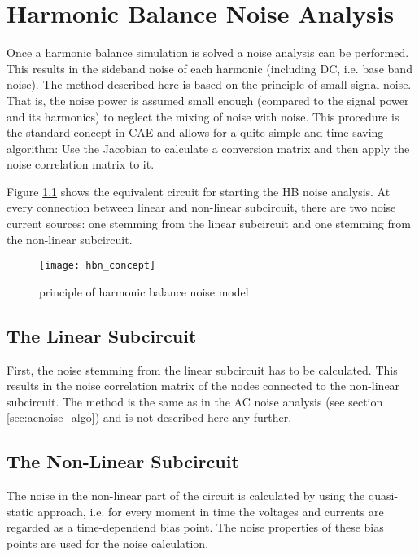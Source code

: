 %
%
%
%

\chapter{Harmonic Balance Noise Analysis}
\label{sec:hb_noise}

Once a harmonic balance simulation is solved a noise analysis can
be performed. This results in the sideband noise of each harmonic
(including DC, i.e. base band noise). The method described here
is based on the principle of small-signal noise. That is, the
noise power is assumed small enough (compared to the signal power
and its harmonics) to neglect the mixing of noise with noise.
This procedure is the standard concept in CAE and allows for a
quite simple and time-saving algorithm: Use the Jacobian to
calculate a conversion matrix and then apply the noise correlation
matrix to it.

\addvspace{12pt}

Figure \ref{fig:hbn_concept} shows the equivalent circuit for
starting the HB noise analysis. At every connection between
linear and non-linear subcircuit, there are two noise current
sources: one stemming from the linear subcircuit and one
stemming from the non-linear subcircuit.

\begin{figure}[ht]
\begin{center}
\texttt{[image: hbn\_concept]}
\end{center}
\caption{principle of harmonic balance noise model}
\label{fig:hbn_concept}
\end{figure}
\FloatBarrier


\section{The Linear Subcircuit}

First, the noise stemming from the linear subcircuit has to be
calculated. This results in the noise correlation matrix of the
nodes connected to the non-linear subcircuit. The method is the
same as in the AC noise analysis (see section
\ref{sec:acnoise_algo}) and is not described here any
further.


\section{The Non-Linear Subcircuit}

The noise in the non-linear part of the circuit is calculated
by using the quasi-static approach, i.e. for every moment in
time the voltages and currents are regarded as a time-dependend
bias point. The noise properties of these bias points are
used for the noise calculation.
